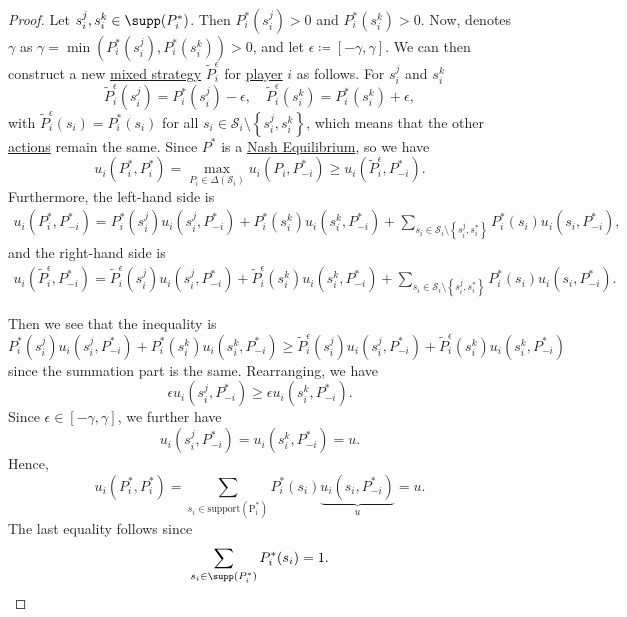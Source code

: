 \begin{proof}
	Let \(s_{i}^j, s_{i}^k\in \supp(P_i^{\ast}) \). Then \(P_i^{\ast}(s_{i}^j)>0\) and \(P_i^{\ast}(s_{i}^k)>0\). Now, denotes \(\gamma\) as \(\gamma = \min\left(P_i^{\ast}(s_{i}^j), P_i^{\ast}(s_{i}^k)\right)>0\), and let \(\epsilon\coloneqq \left[-\gamma, \gamma\right]\). We can then construct a new \hyperref[def:mixed-strategy]{mixed strategy} \(\widetilde{P}_{i}^{\epsilon}\) for \hyperref[def:player]{player} \(i\) as follows. For \(s_{i}^j\) and \(s_{i}^k\)
	\[
		\widetilde{P}_{i}^{\epsilon}(s_{i}^j) = P_i^{\ast}(s_{i}^j)- \epsilon,\quad\widetilde{P}_{i}^{\epsilon}(s_{i}^k) = P_i^{\ast}(s_{i}^k)+\epsilon,
	\]
	with \(\widetilde{P}_{i}^{\epsilon}(s_{i}) = P_i^{\ast}(s_{i})\) for all \(s_{i}\in \mathcal{S}_{i}\setminus\left\{s_{i}^j, s_{i}^k\right\}\), which means that the other \hyperref[def:strategy]{actions} remain the same. Since \(P^{\ast}\) is a \hyperref[def:Nash-equilibrium]{Nash Equilibrium}, so we have
	\[
		u_{i}\left(P^{\ast}_i, P_{i}^{\ast}\right) = \max_{P_{i}\in \Delta(\mathcal{S}_{i})} u_{i}(P_{i}, P_{-i}^{\ast}) \geq u_{i}(\widetilde{P}_{i}^{\epsilon}, P_{-i}^{\ast}).
	\]
	Furthermore, the left-hand side is
	\[
		\begin{split}
			u_{i}\left(P^{\ast}_i, P_{-i}^{\ast}\right) = P_{i}^{\ast}(s_{i}^j)u_{i}(s_{i}^j, P^{\ast}_{-i}) + P^{\ast}_{i}(s_{i}^{k})u_{i}(s_{i}^{k}, P^{\ast}_{-i})
			+ \sum\limits_{ s_{i}\in \mathcal{S}_{i}\setminus\left\{s_{i}^j, s_{i}^*\right\}} P^{\ast}_{i}(s_{i})u_{i}(s_{i}, P^{\ast}_{-i}),
		\end{split}
	\]
	and the right-hand side is
	\[
		\begin{split}
			u_{i}\left(\widetilde{P}^{\epsilon}_i, P_{-i}^{\ast}\right) = \widetilde{P}_{i}^{\epsilon}(s_{i}^j)u_{i}(s_{i}^j, P^{\ast}_{-i}) + \widetilde{P}^{\epsilon}_{i}(s_{i}^{k})u_{i}(s_{i}^{k}, P^{\ast}_{-i})
			+ \sum\limits_{ s_{i}\in \mathcal{S}_{i}\setminus\left\{s_{i}^j, s_{i}^*\right\}} P^{\ast}_{i}(s_{i})u_{i}(s_{i}, P^{\ast}_{-i}).
		\end{split}
	\]

	Then we see that the inequality is
	\[
		P_{i}^{\ast}(s_{i}^j)u_{i}(s_{i}^j, P_{-i}^{\ast})+ P_{i}^{\ast}(s_{i}^k)u_{i}(s_{i}^k, P_{-i}^{\ast})\geq \widetilde{P}_{i}^{\epsilon}(s_{i}^j)u_{i}(s_{i}^j, P^{\ast}_{-i})+\widetilde{P}_{i}^{\epsilon}(s_{i}^k)u_{i}(s_{i}^k, P^{\ast}_{-i})
	\]
	since the summation part is the same. Rearranging, we have
	\[
		\epsilon u_{i}(s_{i}^j, P^{\ast}_{-i})\geq \epsilon u_{i}(s_{i}^k, P^{\ast}_{-i}).
	\]
	Since \(\epsilon\in\left[-\gamma, \gamma\right]\), we further have
	\[
		u_{i}(s_{i}^j, P^{\ast}_{-i}) = u_{i}(s_{i}^k, P^{\ast}_{-i}) = u.
	\]
	Hence,
	\[
		u_{i}(P^{\ast}_{i}, P^{\ast}_{i}) = \sum\limits_{s_{i}\in \mathrm{\text{support}(P^{\ast}_{i})} }P^{\ast}_{i}(s_{i})\underbrace{u_{i}(s_{i}, P^{\ast}_{-i})}_{u} = u.
	\]
	The last equality follows since
	\[
		\sum\limits_{s_{i}\in \supp(P^{\ast}_i) } P_{i}^{\ast}(s_{i}) = 1.
	\]
\end{proof}

